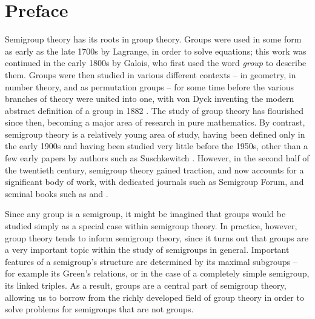 \chapter*{Preface}

Semigroup theory has its roots in group theory.  Groups were used in some form
as early as the late 1700s by Lagrange, in order to solve equations; this work
was continued in the early 1800s by Galois, who first used the word
\textit{group} to describe them.  Groups were then studied in various different
contexts -- in geometry, in number theory, and as permutation groups -- for some
time before the various branches of theory were united into one, with von Dyck
inventing the modern abstract definition of a group in 1882 \cite{dyck_1882}.
The study of group theory has flourished since then, becoming a major area of
research in pure mathematics.  By contrast, semigroup theory is a relatively
young area of study, having been defined only in the early 1900s and having been
studied very little before the 1950s, other than a few early papers by authors
such as Suschkewitch \cite{susch_1928}.  However, in the second half of the
twentieth century, semigroup theory gained traction, and now accounts for a
significant body of work, with dedicated journals such as Semigroup Forum, and
seminal books such as \cite{howie} and \cite{petrich}.

Since any group is a semigroup, it might be imagined that groups would be
studied simply as a special case within semigroup theory.  In practice, however,
group theory tends to inform semigroup theory, since it turns out that groups
are a very important topic within the study of semigroups in general.  Important
features of a semigroup's structure are determined by its maximal subgroups --
for example its Green's relations, or in the case of a completely simple
semigroup, its linked triples.  As a result, groups are a central part of
semigroup theory, allowing us to borrow from the richly developed field of group
theory in order to solve problems for semigroups that are not groups.

